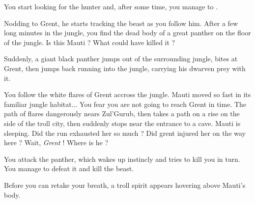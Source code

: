 You start looking for the hunter and, after some time, you manage to .




Nodding to Grent, he starts tracking the beast as you follow him. After a few long minutes in the jungle, you find the dead body of a great panther on the floor of the jungle. Is this Mauti ? What could have killed it ?


Suddenly, a giant black panther jumps out of the surrounding jungle, bites at Grent, then jumps back running into the jungle, carrying his dwarven prey with it.




You follow the white flares of Grent accross the jungle. Mauti moved so fast in its familiar jungle habitat... You fear you are not going to reach Grent in time. The path of flares dangerously nears Zul'Gurub, then takes a path on a rise on the side of the troll city, then suddenly stops near the entrance to a cave. Mauti is sleeping. Did the run exhausted her so much ? Did grent injured her on the way here ? Wait, \textit{Grent} ! Where is he ?



You attack the panther, which wakes up instincly and tries to kill you in turn. You manage to defeat it and kill the beast.

Before you can retake your breath, a troll spirit appears hovering above Mauti's body.





